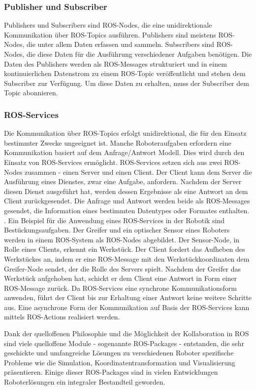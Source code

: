 \subsubsection{Publisher und Subscriber}
Publishers und Subscribers sind ROS-Nodes, die eine unidirektionale Kommunikation über ROS-Topics ausführen. Publishers sind meistens ROS-Nodes, die unter allem Daten erfassen und sammeln. Subscribers sind ROS-Nodes, die diese Daten für die Ausführung verschiedener Aufgaben benötigen. Die Daten des Publishers werden als ROS-Messages strukturiert und in einem kontinuierlichen Datenstrom zu einem ROS-Topic veröffentlicht und stehen dem Subscriber zur Verfügung. Um diese Daten zu erhalten, muss der Subscriber dem Topic abonnieren.

\subsubsection{ROS-Services}
Die Kommunikation über ROS-Topics erfolgt unidirektional, die für den Einsatz bestimmter Zwecke ungeeignet ist. Manche Roboteraufgaben erfordern eine Kommunikation basiert auf dem Anfrage/Antwort Modell. Dies wird durch den Einsatz von ROS-Services ermöglicht. ROS-Services setzen sich aus zwei ROS-Nodes zusammen - einen Server und einen Client. Der Client kann dem Server die Ausführung eines Dienstes, zwar eine Aufgabe, anfordern. Nachdem der Server diesen Dienst ausgeführt hat, werden dessen Ergebnisse als eine Antwort an dem Client zurückgesendet. Die Anfrage und Antwort werden beide als ROS-Messages gesendet, die Information eines bestimmten Datentypes oder Formates enthalten. \autocite[24]{LentinMasteringROS2018}. Ein Beispiel für die Anwendung eines ROS-Services in der Robotik sind Bestückungsaufgaben. Der Greifer und ein optischer Sensor eines Roboters werden in einem ROS-System als ROS-Nodes abgebildet. Der Sensor-Node, in Rolle eines Clients, erkennt ein Werkstück. Der Client fordert das Aufheben des Werkstückes an, indem er eine ROS-Message mit den Werkstückkoordinaten dem Greifer-Node sendet, der die Rolle des Servers spielt. Nachdem der Greifer das Werkstück aufgehoben hat, schickt er dem Client eine Antwort in Form einer ROS-Message zurück. Da ROS-Services eine synchrone Kommunikationsform anwenden, führt der Client bis zur Erhaltung einer Antwort keine weitere Schritte aus. Eine asynchrone Form der Kommunikation auf Basis der ROS-Services kann mittels ROS-Actions realisiert werden.

Dank der quelloffenen Philosophie und die Möglichkeit der Kollaboration in ROS sind viele quelloffene Module - sogenannte ROS-Packages - entstanden, die sehr geschickte und umfangreiche Lösungen zu verschiedenen Roboter spezifische Probleme wie die Simulation, Koordinatentransformation und Visualisierung präsentieren. Einige dieser ROS-Packages sind in vielen Entwicklungen Roboterlösungen ein integraler Bestandteil geworden.

